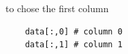 to chose the first column
\begin{verbatim}
    data[:,0] # column 0
    data[:,1] # column 1
\end{verbatim}